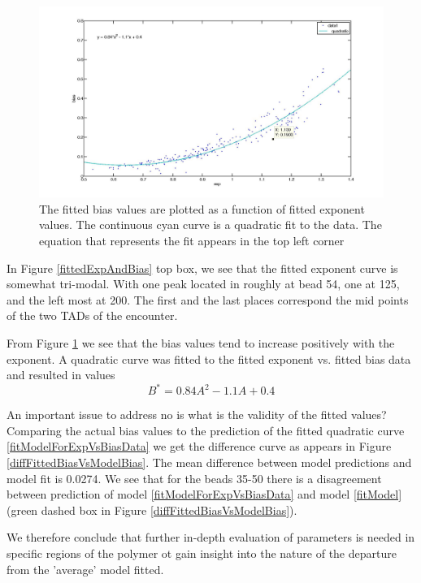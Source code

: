 \documentclass[12pt]{paper}
\begin{document}
\begin{figure}[H]
\includegraphics[scale=0.15]{fittedExpVsFittedBias}
\caption{\scriptsize{The fitted bias values are plotted as a function of fitted exponent values. The continuous cyan curve is a quadratic fit to the data. The equation that represents the fit appears in the top left corner}}
\label{fittedExpVsFittedBias}
\end{figure}

In Figure \ref{fittedExpAndBias} top box, we see that the fitted exponent curve is somewhat tri-modal. With one peak located in roughly at bead 54, one at 125, and the left most at 200. The first and the last places correspond the mid points of the two TADs of the encounter. 

From Figure \ref{fittedExpVsFittedBias} we see that the bias values tend to increase positively with the exponent. A quadratic curve was fitted to the fitted exponent vs. fitted bias data and resulted in values
\begin{equation}\label{fitModelForExpVsBiasData}
B^* = 0.84A^2-1.1A+0.4
\end{equation}

 An important issue to address no is what is the validity of the fitted values?
Comparing the actual bias values to the prediction of the fitted quadratic curve \ref{fitModelForExpVsBiasData} we get the difference curve as appears in Figure \ref{diffFittedBiasVsModelBias}. The mean difference between model predictions and model fit is 0.0274. We see that for the beads 35-50 there is a disagreement between prediction of model \ref{fitModelForExpVsBiasData} and model \ref{fitModel} (green dashed box in Figure \ref{diffFittedBiasVsModelBias}). 

We therefore conclude that further in-depth evaluation of parameters is needed in specific regions of the polymer ot gain insight into the nature of the departure from the 'average' model fitted.
\end{document}
